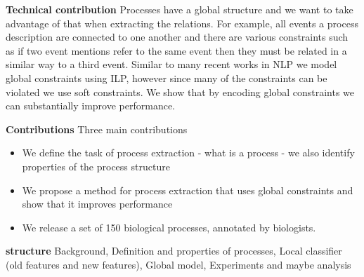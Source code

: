 \textbf{Technical contribution} Processes have a global structure and we want to take advantage of that when extracting the relations. For example, all events a process description are connected to one another and there are various constraints such as if two event mentions refer to the same event then they must be related in a similar way to a third event. Similar to  many recent works in NLP \cite{} we model global constraints using ILP, however since many of the constraints can be violated we use soft constraints. We show that by encoding global constraints we can substantially improve performance.

\textbf{Contributions} Three main contributions
\begin{itemize}
\item We define the task of process extraction - what is a process - we also identify properties of the process structure
\item We propose a method for process extraction that uses global constraints and show that it improves performance
\item We release a set of 150 biological processes, annotated by biologists.
\end{itemize}

\textbf{structure} Background, Definition and properties of processes, Local classifier (old features and new features), Global model, Experiments and maybe analysis